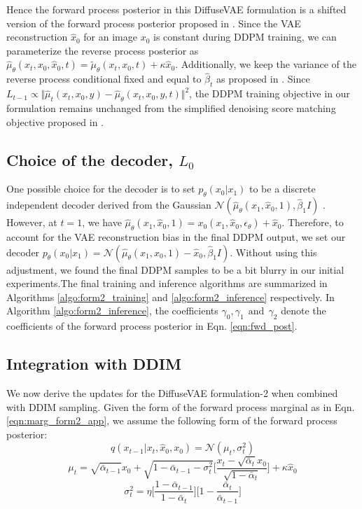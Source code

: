 \documentclass[10pt]{article} \usepackage[accepted]{tmlr}
\begin{document}
Hence the forward process posterior in this DiffuseVAE formulation is a shifted version of the forward process posterior proposed in \citep{ho2020denoising}. Since the VAE reconstruction $\hat{x}_0$ for an image $x_0$ is constant during DDPM training, we can parameterize the reverse process posterior as $\hat{\mu}_{\theta}(x_t, x_0, \hat{x}_0, t) = \tilde{\mu}_{\theta}(x_t, x_0, t) + \kappa \hat{x}_0$. Additionally, we keep the variance of the reverse process conditional fixed and equal to $\hat{\beta}_t$ as proposed in \citep{ho2020denoising}. Since $L_{t-1} \propto \Vert \hat{\mu}_{t}(x_t, x_0, y) - \hat{\mu}_{\theta}(x_t, x_0, y, t)\Vert^2$, the DDPM training objective in our formulation remains unchanged from the simplified denoising score matching objective proposed in \citep{ho2020denoising}.\\

\noindent
\subsection{Choice of the decoder, $L_0$}
One possible choice for the decoder is to set $p_{\theta}(x_0|x_1)$ to be a discrete independent decoder derived from the Gaussian $\mathcal{N}(\hat{\mu}_{\theta}(x_1, \hat{x}_0, 1), \hat{\beta}_1I)$ \citep{ho2020denoising}. However, at $t=1$, we have $\hat{\mu}_{\theta}(x_1, \hat{x}_0, 1) = x_0(x_1, \hat{x}_0, \epsilon_{\theta}) + \hat{x}_0$. Therefore, to account for the VAE reconstruction bias in the final DDPM output, we set our decoder $p_{\theta}(x_0|x_1) = \mathcal{N}(\hat{\mu}_{\theta}(x_1, \hat{x}_0, 1) - \hat{x}_0, \hat{\beta}_1I)$. Without using this adjustment, we found the final DDPM samples to be a bit blurry in our initial experiments.The final training and inference algorithms are summarized in Algorithms \ref{algo:form2_training} and \ref{algo:form2_inference} respectively. In Algorithm \ref{algo:form2_inference}, the coefficients $\gamma_0, \gamma_1 \:\: \text{and} \:\:\gamma_2$ denote the coefficients of the forward process posterior in Eqn. \ref{eqn:fwd_post}.

\noindent
\subsection{Integration with DDIM}
We now derive the updates for the DiffuseVAE formulation-2 when combined with DDIM sampling. Given the form of the forward process marginal as in Eqn. \ref{eqn:marg_form2_app}, we assume the following form of the forward process posterior:
\begin{equation}
    q(x_{t-1}|x_t, \hat{x}_0, x_0) = \mathcal{N}(\mu_t, \sigma_t^2)
\end{equation}
\begin{equation}
    \mu_t = \sqrt{\bar{\alpha}_{t-1}}x_0 + \sqrt{1 - \bar{\alpha}_{t-1} - \sigma_t^2}\Bigg[\frac{x_t - \sqrt{\bar{\alpha}_t}x_0}{\sqrt{1 - \bar{\alpha}_t}}\Bigg] + \kappa \hat{x}_0
\end{equation}
\begin{equation}
    \sigma_t^2 = \eta\Bigg[\frac{1 - \bar{\alpha}_{t-1}}{1 - \bar{\alpha}_t}\Bigg]\Bigg[1 - \frac{\bar{\alpha}_t}{\bar{\alpha}_{t-1}}\Bigg]
\end{equation}
\end{document}
